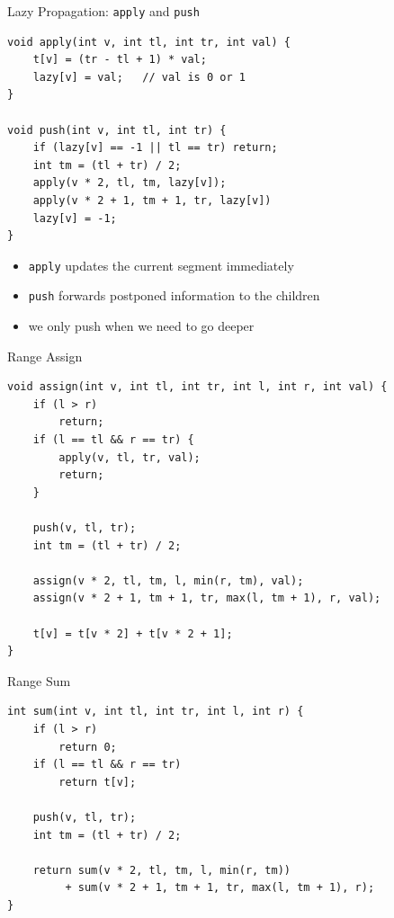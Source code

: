 \documentclass[aspectratio=169]{beamer}
\begin{document}
\begin{frame}[fragile]{Lazy Propagation: \texttt{apply} and \texttt{push}}
\scriptsize
\begin{verbatim}
void apply(int v, int tl, int tr, int val) {
    t[v] = (tr - tl + 1) * val;
    lazy[v] = val;   // val is 0 or 1
}

void push(int v, int tl, int tr) {
    if (lazy[v] == -1 || tl == tr) return;
    int tm = (tl + tr) / 2;
    apply(v * 2, tl, tm, lazy[v]);
    apply(v * 2 + 1, tm + 1, tr, lazy[v])
    lazy[v] = -1;
}
\end{verbatim}

    \normalsize
    \begin{itemize}
        \item \texttt{apply} updates the current segment immediately
        \item \texttt{push} forwards postponed information to the children
        \item we only push when we need to go deeper
    \end{itemize}
\end{frame}

\begin{frame}[fragile]{Range Assign}
\scriptsize
\begin{verbatim}
void assign(int v, int tl, int tr, int l, int r, int val) {
    if (l > r)
        return;
    if (l == tl && r == tr) {
        apply(v, tl, tr, val);
        return;
    }

    push(v, tl, tr);
    int tm = (tl + tr) / 2;

    assign(v * 2, tl, tm, l, min(r, tm), val);
    assign(v * 2 + 1, tm + 1, tr, max(l, tm + 1), r, val);

    t[v] = t[v * 2] + t[v * 2 + 1];
}
\end{verbatim}
\end{frame}

\begin{frame}[fragile]{Range Sum}
\scriptsize
\begin{verbatim}
int sum(int v, int tl, int tr, int l, int r) {
    if (l > r)
        return 0;
    if (l == tl && r == tr)
        return t[v];

    push(v, tl, tr);
    int tm = (tl + tr) / 2;

    return sum(v * 2, tl, tm, l, min(r, tm))
         + sum(v * 2 + 1, tm + 1, tr, max(l, tm + 1), r);
}
\end{verbatim}
\end{frame}
\end{document}
